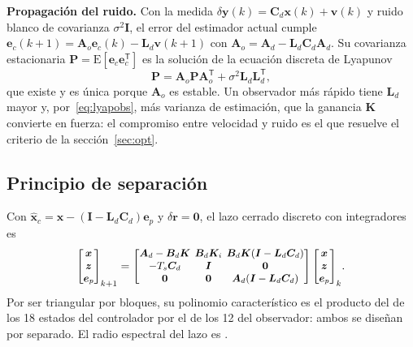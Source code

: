 \documentclass[conference]{IEEEtran}
\newcommand{\vect}[1]{\bm{#1}}
\newcommand{\T}{^{\mathsf{T}}}
\begin{document}
\textbf{Propagación del ruido.} Con la medida $\delta\vect y(k) = \vect C_d\vect x(k) + \vect v(k)$ y ruido blanco de covarianza $\sigma^2\vect I$, el error del estimador actual cumple $\vect e_c(k+1) = \vect A_o\vect e_c(k) - \vect L_d\vect v(k+1)$ con $\vect A_o = \vect A_d - \vect L_d\vect C_d\vect A_d$. Su covarianza estacionaria $\vect P = \mathrm{E}[\vect e_c\vect e_c\T]$ es la solución de la ecuación discreta de Lyapunov
\begin{equation}
\vect P = \vect A_o\vect P\vect A_o\T + \sigma^2\vect L_d\vect L_d\T ,
\label{eq:lyapobs}
\end{equation}
que existe y es única porque $\vect A_o$ es estable. Un observador más rápido tiene $\vect L_d$ mayor y, por~\eqref{eq:lyapobs}, más varianza de estimación, que la ganancia $\vect K$ convierte en fuerza: el compromiso entre velocidad y ruido es el que resuelve el criterio de la sección~\ref{sec:opt}.

\subsection{Principio de separación}

Con $\hat{\vect x}_c = \vect x - (\vect I - \vect L_d\vect C_d)\vect e_p$ y $\delta\vect r = \vect 0$, el lazo cerrado discreto con integradores es
\begin{equation}
{\setlength{\arraycolsep}{2pt}\small
\begin{bmatrix}\vect x\\ \vect z\\ \vect e_p\end{bmatrix}_{k+1} =
\begin{bmatrix}
\vect A_d - \vect B_d\vect K & \vect B_d\vect K_i & \vect B_d\vect K(\vect I - \vect L_d\vect C_d)\\
-T_s\vect C_d & \vect I & \vect 0\\
\vect 0 & \vect 0 & \vect A_d(\vect I - \vect L_d\vect C_d)
\end{bmatrix}
\begin{bmatrix}\vect x\\ \vect z\\ \vect e_p\end{bmatrix}_{k}}.
\end{equation}
Por ser triangular por bloques, su polinomio característico es el producto del de los 18 estados del controlador por el de los 12 del observador: ambos se diseñan por separado. El radio espectral del lazo es \rhoSS.
\end{document}
